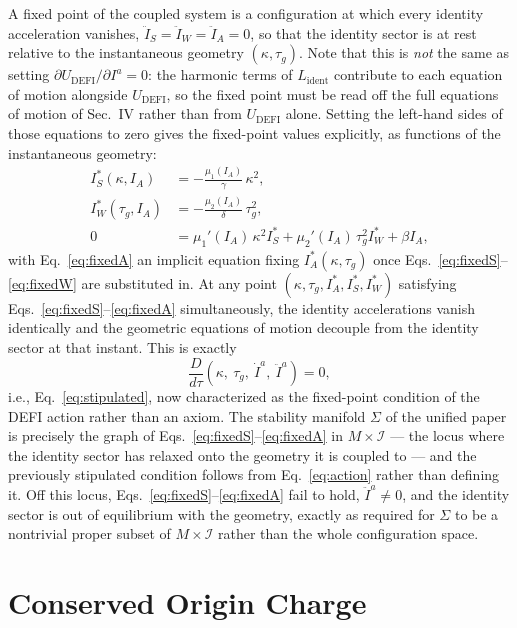 \documentclass[aip,jmp,reprint,onecolumn,nofootinbib]{revtex4-2}
\begin{document}
A fixed point of the coupled system is a configuration at which every identity
acceleration vanishes, $\ddot I_S=\ddot I_W=\ddot I_A=0$, so that the identity
sector is at rest relative to the instantaneous geometry $(\kappa,\tau_g)$. Note
that this is \emph{not} the same as setting $\partial U_{\text{DEFI}}/\partial
I^a=0$: the harmonic terms of $L_{\text{ident}}$ contribute to each equation of
motion alongside $U_{\text{DEFI}}$, so the fixed point must be read off the full
equations of motion of Sec.~IV rather than from $U_{\text{DEFI}}$ alone. Setting
the left-hand sides of those equations to zero gives the fixed-point values
explicitly, as functions of the instantaneous geometry:
\begin{align}
I_S^\ast(\kappa,I_A) &= -\frac{\mu_1(I_A)}{\gamma}\,\kappa^2,
\label{eq:fixedS}\\
I_W^\ast(\tau_g,I_A) &= -\frac{\mu_2(I_A)}{\delta}\,\tau_g^2,
\label{eq:fixedW}\\
0 &= \mu_1'(I_A)\,\kappa^2 I_S^\ast + \mu_2'(I_A)\,\tau_g^2 I_W^\ast + \beta I_A,
\label{eq:fixedA}
\end{align}
with Eq.~\eqref{eq:fixedA} an implicit equation fixing $I_A^\ast(\kappa,\tau_g)$
once Eqs.~\eqref{eq:fixedS}--\eqref{eq:fixedW} are substituted in. At any point
$(\kappa,\tau_g,I_A^\ast,I_S^\ast,I_W^\ast)$ satisfying
Eqs.~\eqref{eq:fixedS}--\eqref{eq:fixedA} simultaneously, the identity
accelerations vanish identically and the geometric equations of motion decouple
from the identity sector at that instant. This is exactly
\begin{equation}
\frac{D}{d\tau}\left(\kappa,\ \tau_g,\ \dot I^a,\ \ddot I^a\right) = 0,
\end{equation}
i.e., Eq.~\eqref{eq:stipulated}, now characterized as the fixed-point condition
of the DEFI action rather than an axiom. The stability manifold $\Sigma$ of the
unified paper \cite{DuttonUnified2026} is precisely the graph of
Eqs.~\eqref{eq:fixedS}--\eqref{eq:fixedA} in $M\times\mathcal{I}$ --- the locus
where the identity sector has relaxed onto the geometry it is coupled to --- and
the previously stipulated condition follows from Eq.~\eqref{eq:action} rather
than defining it. Off this locus, Eqs.~\eqref{eq:fixedS}--\eqref{eq:fixedA} fail
to hold, $\ddot I^a\neq0$, and the identity sector is out of equilibrium with the
geometry, exactly as required for $\Sigma$ to be a nontrivial proper subset of
$M\times\mathcal{I}$ rather than the whole configuration space.

\section{Conserved Origin Charge}
\label{sec:origin}
\end{document}
